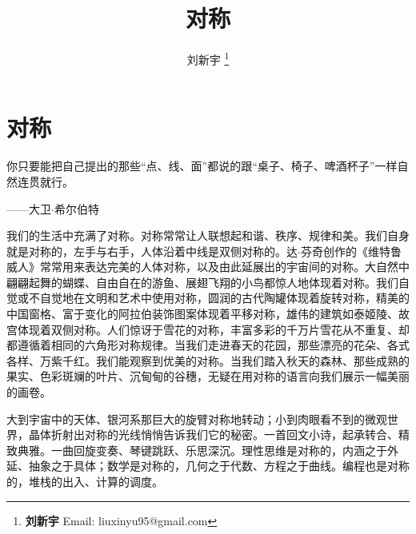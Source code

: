 \documentclass[b5paper]{ctexart}
\begin{document}
\title{对称}

\author{刘新宇
\thanks{{\bfseries 刘新宇} \newline
  Email: liuxinyu95@gmail.com \newline}
  }

\maketitle
\fi


\ifx\wholebook\relax
\chapter{对称}
\fi

\epigraph{你只要能把自己提出的那些“点、线、面”都说的跟“桌子、椅子、啤酒杯子”一样自然连贯就行。}{——大卫$\cdot$希尔伯特}


我们的生活中充满了对称。对称常常让人联想起和谐、秩序、规律和美。我们自身就是对称的，左手与右手，人体沿着中线是双侧对称的。达$\cdot$芬奇创作的《维特鲁威人》常常用来表达完美的人体对称，以及由此延展出的宇宙间的对称。大自然中翩翩起舞的蝴蝶、自由自在的游鱼、展翅飞翔的小鸟都惊人地体现着对称。我们自觉或不自觉地在文明和艺术中使用对称，圆润的古代陶罐体现着旋转对称，精美的中国窗格、富于变化的阿拉伯装饰图案体现着平移对称，雄伟的建筑如泰姬陵、故宫体现着双侧对称。人们惊讶于雪花的对称，丰富多彩的千万片雪花从不重复、却都遵循着相同的六角形对称规律。当我们走进春天的花园，那些漂亮的花朵、各式各样、万紫千红。我们能观察到优美的对称。当我们踏入秋天的森林、那些成熟的果实、色彩斑斓的叶片、沉甸甸的谷穗，无疑在用对称的语言向我们展示一幅美丽的画卷。

大到宇宙中的天体、银河系那巨大的旋臂对称地转动；小到肉眼看不到的微观世界，晶体折射出对称的光线悄悄告诉我们它的秘密。一首回文小诗，起承转合、精致典雅。一曲回旋变奏、琴键跳跃、乐思深沉。理性思维是对称的，内涵之于外延、抽象之于具体；数学是对称的，几何之于代数、方程之于曲线。编程也是对称的，堆栈的出入、计算的调度。
\end{document}
